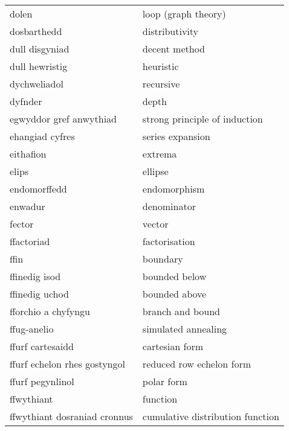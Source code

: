 \begin{supertabular}{p{0.22\textwidth}p{0.22\textwidth}}
                           dolen &               loop (graph theory) \\
                     dosbarthedd &                    distributivity \\
                  dull disgyniad &                     decent method \\
                  dull hewristig &                         heuristic \\
                    dychweliadol &                         recursive \\
                         dyfnder &                             depth \\
         egwyddor gref anwythiad &     strong principle of induction \\
                 ehangiad cyfres &                  series expansion \\
                       eithafion &                           extrema \\
                           elips &                           ellipse \\
                    endomorffedd &                      endomorphism \\
                         enwadur &                       denominator \\
                          fector &                            vector \\
                      ffactoriad &                     factorisation \\
                            ffin &                          boundary \\
                   ffinedig isod &                     bounded below \\
                  ffinedig uchod &                     bounded above \\
             fforchio a chyfyngu &                  branch and bound \\
                     ffug-anelio &               simulated annealing \\
                ffurf cartesaidd &                    cartesian form \\
    ffurf echelon rhes gostyngol &          reduced row echelon form \\
                ffurf pegynlinol &                        polar form \\
                      ffwythiant &                          function \\
    ffwythiant dosraniad cronnus &  cumulative distribution function \\

\end{supertabular}
